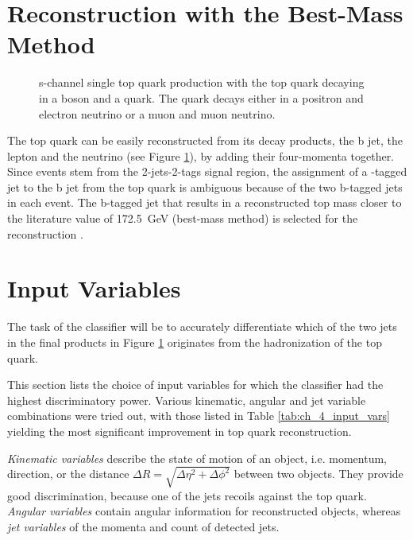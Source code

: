 \section{Reconstruction with the Best-Mass Method}
\label{sec:ch-4-best-mass}
\begin{figure}[h]
    \centering
    
    \caption{s-channel single top quark production with the top quark decaying in a \PWplus boson and a \Pbottom quark. The \PWplus quark decays either in a positron and electron neutrino or a muon and muon neutrino.}
    \label{fig:ch_4_single_top_reco}
\end{figure}
The top quark can be easily reconstructed from its decay products, the b jet, the lepton and the neutrino (see Figure \ref{fig:ch_4_single_top_reco}), by adding their four-momenta together. Since events stem from the 2-jets-2-tags signal region, the assignment of a \Pbottom-tagged jet to the b jet from the top quark is ambiguous because of the two b-tagged jets in each event. The b-tagged jet that results in a reconstructed top mass closer to the literature value of \SI{172.5}{GeV} (best-mass method) is selected for the reconstruction \cite{Fal18}.

\section{Input Variables}
\label{sec:ch-4-input-vars}
The task of the classifier will be to accurately differentiate which of the two \Pbottom jets in the final products in Figure \ref{fig:ch_4_single_top_reco} originates from the hadronization of the top quark.

This section lists the choice of input variables for which the classifier had the highest discriminatory power. Various kinematic, angular and jet variable combinations were tried out, with those listed in Table \ref{tab:ch_4_input_vars} yielding the most significant improvement in top quark reconstruction.

\emph{Kinematic variables} describe the state of motion of an object, i.e. momentum, direction, or the distance $\Delta R=\sqrt{\Delta \eta^2 + \Delta \phi^2}$ between two objects. They provide good discrimination, because one of the jets recoils against the top quark. \emph{Angular variables} contain angular information for reconstructed objects, whereas \emph{jet variables} of the momenta and count of detected jets.

